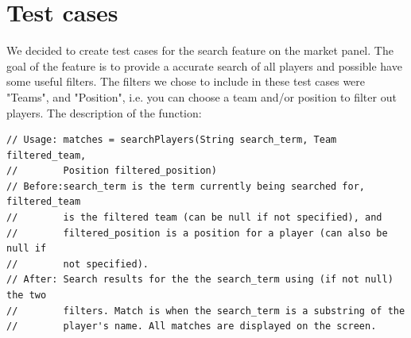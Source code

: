 \documentclass{article}
\begin{document}
\section{Test cases}
We decided to create test cases for the search feature on the market panel. The goal of the feature is to provide a accurate search of all players and possible have some useful filters. The filters we chose to include in these test cases were "Teams", and "Position", i.e. you can choose a team and/or position to filter out players. The description of the function:
\begin{lstlisting}
// Usage: matches = searchPlayers(String search_term, Team filtered_team, 
//        Position filtered_position)
// Before:search_term is the term currently being searched for, filtered_team
//        is the filtered team (can be null if not specified), and
//        filtered_position is a position for a player (can also be null if
//        not specified).
// After: Search results for the the search_term using (if not null) the two
//        filters. Match is when the search_term is a substring of the 
//        player's name. All matches are displayed on the screen.
\end{lstlisting}
\end{document}
